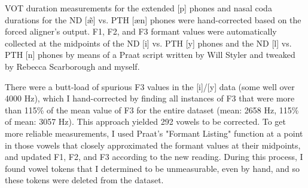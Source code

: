 VOT duration measurements for the extended [p] phones and nasal coda durations for the ND [\~{\ae}] vs. PTH [\ae n] phones were hand-corrected based on the forced aligner's output. %
F1, F2, and F3 formant values were automatically collected at the midpoints of the ND [i] vs. PTH [y] phones and the ND [l] vs. PTH [n] phones by means of a Praat script written by Will Styler and tweaked by Rebecca Scarborough and myself.

There were a butt-load of spurious F3 values in the [i]/[y] data (some well over 4000 Hz), which I hand-corrected by finding all instances of F3 that were more than 115\% of the mean value of F3 for the entire dataset (mean: 2658 Hz, 115\% of mean: 3057 Hz). This approach yielded 292 vowels to be corrected. To get more reliable measurements, I used Praat's "Formant Listing" function at a point in those vowels that closely approximated the formant values at their midpoints, and updated F1, F2, and F3 according to the new reading. During this process, I found \xxxxx{} vowel tokens that I determined to be unmeasurable, even by hand, and so these tokens were deleted from the dataset. 

